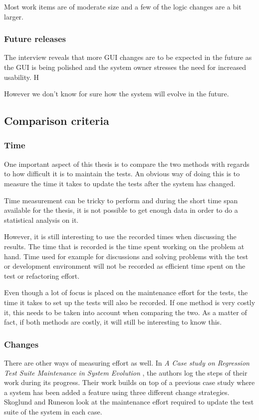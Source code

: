\documentclass{article}
\begin{document}
		Most work items are of moderate size and a few of the logic changes are a bit larger.
		
		\subsubsection{Future releases}
		The interview reveals that more GUI changes are to be expected in the future as the GUI is being polished and the system owner stresses the need for increased usability. H

		However we don't know for sure how the system will evolve in the future.

		\subsection{Comparison criteria}
			\subsubsection{Time}
			One important aspect of this thesis is to compare the two methods with regards to how difficult it is to maintain the tests. An obvious way of doing this is to measure the time it takes to update the tests after the system has changed. 

			Time measurement can be tricky to perform and during the short time span available for the thesis, it is not possible to get enough data in order to do a statistical analysis on it. 

			However, it is still interesting to use the recorded times when discussing the results. The time that is recorded is the time spent working on the problem at hand. Time used for example for discussions and solving problems with the test or development environment will not be recorded as efficient time spent on the test or refactoring effort.
			
			Even though a lot of focus is placed on the maintenance effort for the tests, the time it takes to set up the tests will also be recorded. If one method is very costly it, this needs to be taken into account when comparing the two. As a matter of fact, if both methods are costly, it will still be interesting to know this.

			\subsubsection{Changes}
			There are other ways of measuring effort as well. In {\em A Case study on Regression Test Suite Maintenance in System Evolution} \cite{regression}, the authors log the steps of their work during its progress. 
			Their work builds on top of a previous case study where a system has been added a feature using three different change strategies. Skoglund and Runeson look at the maintenance effort required to update the test suite of the system in each case. 
\end{document}
